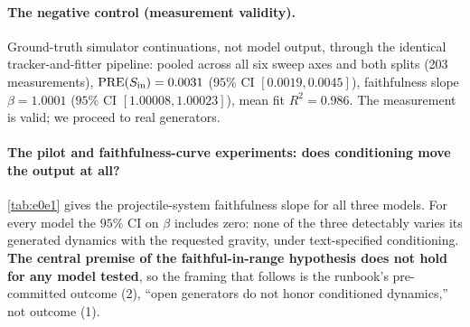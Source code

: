 \documentclass[10pt,twocolumn,letterpaper]{article}
\begin{document}
\paragraph{The negative control (measurement validity).}
Ground-truth simulator continuations, not model output, through the identical
tracker-and-fitter pipeline: pooled across all six sweep axes and both splits
(203 measurements), $\mathrm{PRE}(S_\text{in}) = 0.0031$ ($95\%$ CI $[0.0019,
0.0045]$), faithfulness slope $\beta = 1.0001$ ($95\%$ CI $[1.00008,
1.00023]$), mean fit $R^2 = 0.986$. The measurement is valid; we proceed to
real generators.

\paragraph{The pilot and faithfulness-curve experiments: does conditioning move the output at all?}
\autoref{tab:e0e1} gives the projectile-system faithfulness slope for all
three models. For every model the $95\%$ CI on $\beta$ includes zero: none of
the three detectably varies its generated dynamics with the requested
gravity, under text-specified conditioning. \textbf{The central premise of the faithful-in-range
hypothesis does not hold for any model tested}, so the framing that follows is
the runbook's pre-committed outcome (2), ``open generators do not honor
conditioned dynamics,'' not outcome (1).

\begin{center}
\renewcommand{\arraystretch}{1.2}
\label{tab:e0e1}
\end{center}
\end{document}
